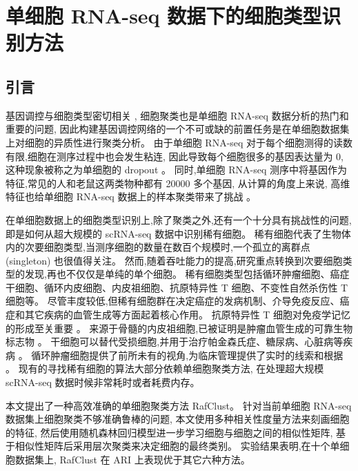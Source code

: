\section{单细胞 RNA-seq 数据下的细胞类型识别方法}
\label{sec:rafclust}

\subsection{引言}

基因调控与细胞类型密切相关 ,
细胞聚类也是单细胞 RNA-seq 数据分析的热门和重要的问题, 
因此构建基因调控网络的一个不可或缺的前置任务是在单细胞数据集上对细胞的异质性进行聚类分析。
由于单细胞 RNA-seq 对于每个细胞测得的读数有限,细胞在测序过程中也会发生粘连,
因此导致每个细胞很多的基因表达量为 0,
这种现象被称之为单细胞的 dropout 。
同时,单细胞 RNA-seq 测序中将基因作为特征,常见的人和老鼠这两类物种都有 20000 多个基因,
从计算的角度上来说, 高维特征也给单细胞 RNA-seq 数据上的样本聚类带来了挑战 。

在单细胞数据上的细胞类型识别上,除了聚类之外,还有一个十分具有挑战性的问题,即是如何从超大规模的 scRNA-seq 数据中识别稀有细胞。
稀有细胞代表了生物体内的次要细胞类型,当测序细胞的数量在数百个规模时,一个孤立的离群点 (singleton) 也很值得关注。
然而,随着吞吐能力的提高,研究重点转换到次要细胞类型的发现,再也不仅仅是单纯的单个细胞。
稀有细胞类型包括循环肿瘤细胞、癌症干细胞、循环内皮细胞、内皮祖细胞、抗原特异性 T 细胞、不变性自然杀伤性 T 细胞等。
尽管丰度较低,但稀有细胞群在决定癌症的发病机制、介导免疫反应、癌症和其它疾病的血管生成等方面起着核心作用。
抗原特异性 T 细胞对免疫学记忆的形成至关重要 。
来源于骨髓的内皮祖细胞,已被证明是肿瘤血管生成的可靠生物标志物 。
干细胞可以替代受损细胞,并用于治疗帕金森氏症、糖尿病、心脏病等疾病 。
循环肿瘤细胞提供了前所未有的视角,为临床管理提供了实时的线索和根据 。
现有的寻找稀有细胞的算法大部分依赖单细胞聚类方法,
在处理超大规模 scRNA-seq 数据时候非常耗时或者耗费内存。

本文提出了一种高效准确的单细胞聚类方法 RafClust。
针对当前单细胞 RNA-seq 数据集上细胞聚类不够准确鲁棒的问题,
本文使用多种相关性度量方法来刻画细胞的特征, 
然后使用随机森林回归模型进一步学习细胞与细胞之间的相似性矩阵,
基于相似性矩阵后采用层次聚类来决定细胞的最终类别。
实验结果表明,在十个单细胞数据集上, RafClust 在 ARI 上表现优于其它六种方法。

